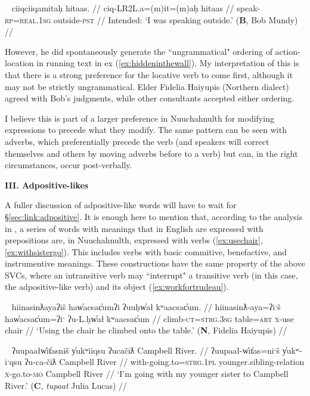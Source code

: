 \ex~ \label{ex:*outsidespeaking}
\begingl
\glpreamble *ciiqciiqamitaḥ hitaas. //
\gla ciq-LR2L.a=(m)it=(m)aḥ hitaas  //
\glb speak-\textsc{rp}=\textsc{real.1sg} outside-\textsc{pst} //
\glft Intended: `I was speaking outside.' (\textbf{B}, Bob Mundy) //
\endgl
\xe

However, he did spontaneously generate the ``ungrammatical" ordering of action-location in running text in ex (\ref{ex:hiddeninthewall}). My interpretation of this is that there is a strong preference for the locative verb to come first, although it may not be strictly ungrammatical. Elder Fidelia Haiyupis (Northern dialect) agreed with Bob's judgments, while other consultants accepted either ordering.

I believe this is part of a larger preference in Nuuchahnulth for modifying expressions to precede what they modify. The same pattern can be seen with adverbs, which preferentially precede the verb (and speakers will correct themselves and others by moving adverbs before to a verb) but can, in the right circumstances, occur post-verbally.

\vspace{10pt}

\noindent \textbf{III. Adpositive-likes}

\vspace{10pt}

A fuller discussion of adpositive-like words will have to wait for \S\ref{sec:link:adpositive}. It is enough here to mention that, according to the analysis in \citep{woo2007b}, a series of words with meanings that in English are expressed with prepositions are, in Nuuchahnulth, expressed with verbs (\ref{ex:usechair}, \ref{ex:withsistergo}). This includes verbs with basic commitive, benefactive, and instrumentive meanings. These constructions have the same property of the above SVCs, where an intransitive verb may ``interrupt" a transitive verb (in this case, the adpositive-like verb) and its object (\ref{ex:workfortrudeau}).


\ex~ \label{ex:usechair}
\begingl
\glpreamble hiinasinƛayaʔiš haw̓acsac̓umʔi ʔuuḥw̓ał kʷaacsac̓um. //
\gla hiinasinƛ-aya=ʔiˑš haw̓acsac̓um=ʔiˑ ʔu-L.ḥw̓ał kʷaacsac̓um //
\glb climb-\textsc{ct}=\textsc{strg.3sg} table=\textsc{art} \textsc{x}-use chair //
\glft `Using the chair he climbed onto the table.' (\textbf{N}, Fidelia Haiyupis) //
\endgl
\xe

\ex~ \label{ex:withsistergo}
\begingl
\glpreamble ʔuupaałw̓it̓asniš y̓ukʷiiqsu ʔucačiƛ Campbell River. //
\gla ʔuupaał-w̓it̓as=niˑš y̓ukʷ-iˑqsu ʔu-ca-čiƛ Campbell River //
\glb with-going.to=\textsc{strg.1pl} younger.sibling-relation \textsc{x}-go.to-\textsc{mo} Campbell River //
\glft `I'm going with my younger sister to Campbell River.' (\textbf{C}, \textit{tupaat} Julia Lucas) //
\endgl
\xe

